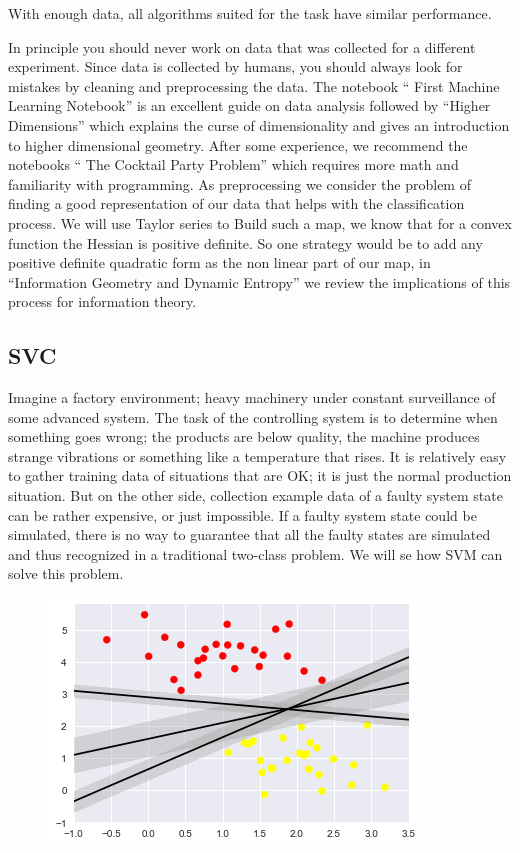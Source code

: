 \documentclass[11pt,letterpaper]{report}
\begin{document}
	 With enough data, all algorithms suited for the task have similar performance. 
	 
	  In principle you should never work on data that was collected for a different experiment. Since data is collected by humans, you should always look for mistakes by cleaning and preprocessing the data. The  notebook `` First Machine Learning Notebook'' is an excellent guide on data analysis followed by ``Higher Dimensions'' which explains the curse of dimensionality and gives an introduction to higher dimensional geometry. After some experience, we recommend  the notebooks `` The Cocktail Party Problem'' which requires more math and familiarity with programming. As preprocessing we consider the problem of finding a good representation of our data that helps with the classification process. We will use Taylor series to Build such a map, we know that for a convex function the Hessian is positive definite. So one strategy would be to add any positive definite quadratic form as the non linear part of our map, in ``Information Geometry and Dynamic Entropy'' we review the implications of this process for information theory.
 	
 	
	\subsection{SVC}
	Imagine a factory environment; heavy machinery under constant surveillance of some advanced system. The task of the controlling system is to determine when something goes wrong; the products are below quality, the machine produces strange vibrations or something like a temperature that rises. It is relatively easy to gather training data of situations that are OK; it is just the normal production situation. But on the other side, collection example data of a faulty system state can be rather expensive, or just impossible. If a faulty system state could be simulated, there is no way to guarantee that all the faulty states are simulated and thus recognized in a traditional two-class problem. We will se how SVM can solve this problem.
	
	\begin{figure}[h!]
		\centering
		\includegraphics[width=0.45\linewidth]{figures/svcl.png}
		\caption{}
		\label{fig:lines}
	\end{figure} 
	
\end{document}
